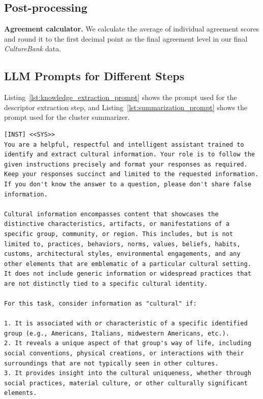 \documentclass{article} %
\newcommand{\dataname}{\textit{CultureBank}\xspace}
\begin{document}
\subsection{Post-processing}
\noindent\textbf{Agreement calculator.} We calculate the average of individual agreement scores and round it to the first decimal point as the final agreement level in our final \dataname data. 

\subsection{LLM Prompts for Different Steps}
Listing~\ref{lst:knowledge_extraction_prompt} shows the prompt used for the descriptor extraction step, and Listing~\ref{lst:summarization_prompt} shows the prompt used for the cluster summarizer. 
\begin{lstlisting}[language={}, caption=Prompt for Llama-2-70B on descriptor extraction, label=lst:knowledge_extraction_prompt]
[INST] <<SYS>>
You are a helpful, respectful and intelligent assistant trained to identify and extract cultural information. Your role is to follow the given instructions precisely and format your responses as required. Keep your responses succinct and limited to the requested information. If you don't know the answer to a question, please don't share false information.

Cultural information encompasses content that showcases the distinctive characteristics, artifacts, or manifestations of a specific group, community, or region. This includes, but is not limited to, practices, behaviors, norms, values, beliefs, habits, customs, architectural styles, environmental engagements, and any other elements that are emblematic of a particular cultural setting. It does not include generic information or widespread practices that are not distinctly tied to a specific cultural identity.

For this task, consider information as "cultural" if:

1. It is associated with or characteristic of a specific identified group (e.g., Americans, Italians, midwestern Americans, etc.).
2. It reveals a unique aspect of that group's way of life, including social conventions, physical creations, or interactions with their surroundings that are not typically seen in other cultures.
3. It provides insight into the cultural uniqueness, whether through social practices, material culture, or other culturally significant elements.


\end{lstlisting}
\end{document}
